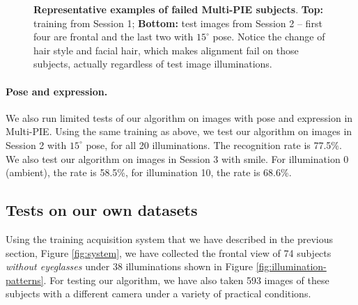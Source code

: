 \begin{figure}
\caption{{\bf Representative examples of failed Multi-PIE subjects}. {\bf Top:} training from Session 1; {\bf Bottom:} test images from Session 2 -- first four are frontal and the last two with $15^\circ$ pose. Notice the change of hair style and facial hair, which makes alignment fail on those subjects, actually regardless of test image illuminations.\vspace{0mm}}\label{fig:failed-examples}
\end{figure}

\paragraph{Pose and expression.} We also run limited tests of our algorithm on images with pose and expression in Multi-PIE.  Using the same training as above, we test our algorithm on images in Session 2 with $15^\circ$ pose, for all 20 illuminations. The recognition rate is 77.5\%. We also test our algorithm on images in Session 3 with smile. For illumination 0 (ambient), the rate is 58.5\%, for illumination 10, the rate is 68.6\%.\vspace{0mm}


\subsection{Tests on our own datasets}\label{sec:own-data}\vspace{0mm}
Using the training acquisition system that we have described in the previous section, Figure \ref{fig:system}, we have collected the frontal view of 74 subjects {\em without eyeglasses} under 38 illuminations shown in Figure \ref{fig:illumination-patterns}. For testing our algorithm, we have also taken 593 images of these subjects with a different camera under a variety of practical conditions.\vspace{0mm}

